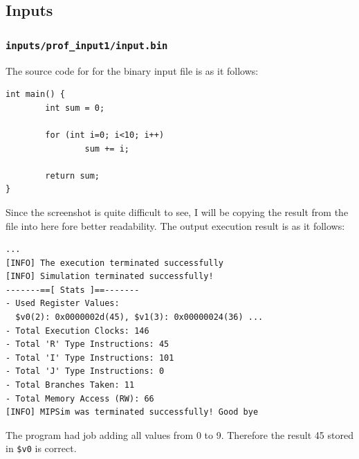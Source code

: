 \documentclass{homework}
\begin{document}
\pagebreak
\subsection{Inputs}
\subsubsection{\texttt{inputs/prof_input1/input.bin}}
The source code for for the binary input file is as it follows:
\\
\begin{center}
\begin{code}
\begin{verbatim}
int main() {
        int sum = 0;

        for (int i=0; i<10; i++)
                sum += i;

        return sum;
}
\end{verbatim}
\end{code}
\end{center}

Since the screenshot is quite difficult to see, I will be copying the result from the file into here fore better readability. The output execution result is as it follows: 
\\
\begin{center}
\begin{code}
\begin{verbatim}
...
[INFO] The execution terminated successfully
[INFO] Simulation terminated successfully!
-------==[ Stats ]==-------
- Used Register Values:
  $v0(2): 0x0000002d(45), $v1(3): 0x00000024(36) ...
- Total Execution Clocks: 146
- Total 'R' Type Instructions: 45
- Total 'I' Type Instructions: 101
- Total 'J' Type Instructions: 0
- Total Branches Taken: 11
- Total Memory Access (RW): 66
[INFO] MIPSim was terminated successfully! Good bye
\end{verbatim}
\end{code}
\end{center}
The program had job adding all values from 0 to 9. Therefore the result 45 stored in \texttt{\$v0} is correct.
\pagebreak
\end{document}
